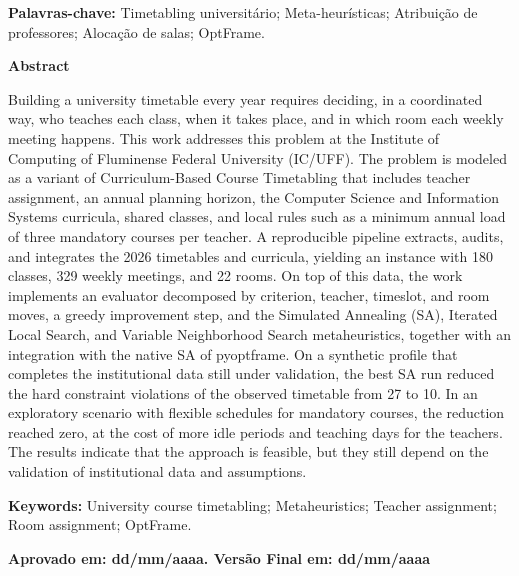 \vspace{0.5\baselineskip}
\noindent\textbf{Palavras-chave:} Timetabling universitário; Meta-heurísticas; Atribuição de professores; Alocação de salas; OptFrame.

\vspace{\baselineskip}
\begin{center}
  \textbf{Abstract}
\end{center}

\noindent Building a university timetable every year requires deciding, in a coordinated way, who teaches each class, when it takes place, and in which room each weekly meeting happens. This work addresses this problem at the Institute of Computing of Fluminense Federal University (IC/UFF). The problem is modeled as a variant of Curriculum-Based Course Timetabling that includes teacher assignment, an annual planning horizon, the Computer Science and Information Systems curricula, shared classes, and local rules such as a minimum annual load of three mandatory courses per teacher. A reproducible pipeline extracts, audits, and integrates the 2026 timetables and curricula, yielding an instance with 180 classes, 329 weekly meetings, and 22 rooms. On top of this data, the work implements an evaluator decomposed by criterion, teacher, timeslot, and room moves, a greedy improvement step, and the Simulated Annealing (SA), Iterated Local Search, and Variable Neighborhood Search metaheuristics, together with an integration with the native SA of pyoptframe. On a synthetic profile that completes the institutional data still under validation, the best SA run reduced the hard constraint violations of the observed timetable from 27 to 10. In an exploratory scenario with flexible schedules for mandatory courses, the reduction reached zero, at the cost of more idle periods and teaching days for the teachers. The results indicate that the approach is feasible, but they still depend on the validation of institutional data and assumptions. 

\vspace{0.5\baselineskip}
\noindent\textbf{Keywords:} University course timetabling; Metaheuristics; Teacher assignment; Room assignment; OptFrame.

\vspace{\baselineskip}
\noindent\textbf{Aprovado em: dd/mm/aaaa. Versão Final em: dd/mm/aaaa}
